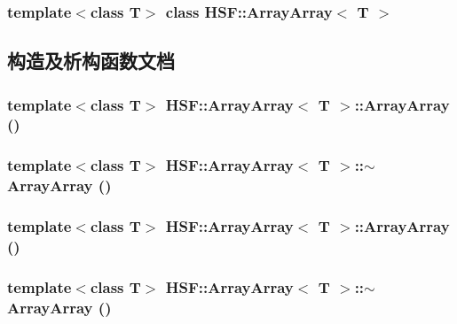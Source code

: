 \subsubsection*{template$<$class T$>$ class HSF::ArrayArray$<$ T $>$}



\subsection{构造及析构函数文档}
\hypertarget{classHSF_1_1ArrayArray_aa4814e95b743e62dfe9557c761c8f6ca}{
\subsubsection[{ArrayArray}]{\setlength{\rightskip}{0pt plus 5cm}template$<$class T$>$ {\bf HSF::ArrayArray}$<$ T $>$::{\bf ArrayArray} ()}}
\label{classHSF_1_1ArrayArray_aa4814e95b743e62dfe9557c761c8f6ca}
\hypertarget{classHSF_1_1ArrayArray_aed22e3e51bb2f14c355cea6664e69601}{
\subsubsection[{$\sim$ArrayArray}]{\setlength{\rightskip}{0pt plus 5cm}template$<$class T$>$ {\bf HSF::ArrayArray}$<$ T $>$::$\sim${\bf ArrayArray} ()}}
\label{classHSF_1_1ArrayArray_aed22e3e51bb2f14c355cea6664e69601}
\hypertarget{classHSF_1_1ArrayArray_aa4814e95b743e62dfe9557c761c8f6ca}{
\subsubsection[{ArrayArray}]{\setlength{\rightskip}{0pt plus 5cm}template$<$class T$>$ {\bf HSF::ArrayArray}$<$ T $>$::{\bf ArrayArray} ()}}
\label{classHSF_1_1ArrayArray_aa4814e95b743e62dfe9557c761c8f6ca}
\hypertarget{classHSF_1_1ArrayArray_aed22e3e51bb2f14c355cea6664e69601}{
\subsubsection[{$\sim$ArrayArray}]{\setlength{\rightskip}{0pt plus 5cm}template$<$class T$>$ {\bf HSF::ArrayArray}$<$ T $>$::$\sim${\bf ArrayArray} ()}}
\label{classHSF_1_1ArrayArray_aed22e3e51bb2f14c355cea6664e69601}


